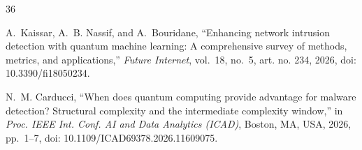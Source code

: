 \begin{thebibliography}{36}
\begin{revbody}
A.~Kaissar, A.~B. Nassif, and A.~Bouridane, ``Enhancing network intrusion
detection with quantum machine learning: A comprehensive survey of methods,
metrics, and applications,'' \emph{Future Internet}, vol.~18, no.~5,
art. no. 234, 2026, doi: 10.3390/fi18050234.
\end{revbody}

\begin{revbody}
N.~M. Carducci, ``When does quantum computing provide advantage for malware
detection? Structural complexity and the intermediate complexity window,'' in
\emph{Proc. IEEE Int. Conf. AI and Data Analytics (ICAD)}, Boston, MA, USA,
2026, pp.~1--7, doi: 10.1109/ICAD69378.2026.11609075.
\end{revbody}

\end{thebibliography}
